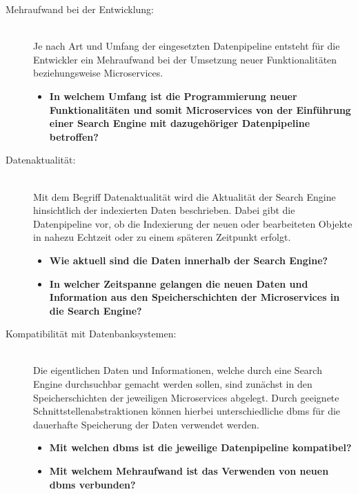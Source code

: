 \begin{description}
    \item[Mehraufwand bei der Entwicklung:]\hfill \\
    Je nach Art und Umfang der eingesetzten Datenpipeline entsteht für die Entwickler ein Mehraufwand bei der Umsetzung neuer Funktionalitäten beziehungsweise Microservices.
    
    \begin{itemize}
        \item \textbf{In welchem Umfang ist die Programmierung neuer Funktionalitäten und somit Microservices von der Einführung einer Search Engine mit dazugehöriger Datenpipeline betroffen?}
    \end{itemize}

    \item[Datenaktualität:]\hfill \\
    Mit dem Begriff \glqq Datenaktualität\grqq{} wird die Aktualität der Search Engine hinsichtlich der indexierten Daten beschrieben. Dabei gibt die Datenpipeline vor, ob die Indexierung der neuen oder bearbeiteten Objekte in nahezu Echtzeit oder zu einem späteren Zeitpunkt erfolgt.

    \begin{itemize}
        \item \textbf{Wie aktuell sind die Daten innerhalb der Search Engine?}
        \item \textbf{In welcher Zeitspanne gelangen die neuen Daten und Information aus den Speicherschichten der Microservices in die Search Engine?}
    \end{itemize}
    
    \item[Kompatibilität mit Datenbanksystemen:]\hfill \\
    Die eigentlichen Daten und Informationen, welche durch eine Search Engine \glqq durchsuchbar\grqq{} gemacht werden sollen, sind zunächst in den Speicherschichten der jeweiligen Microservices abgelegt. Durch geeignete Schnittstellenabstraktionen können hierbei unterschiedliche \gls{dbms} für die dauerhafte Speicherung der Daten verwendet werden.

    \begin{itemize}
        \item \textbf{Mit welchen \gls{dbms} ist die jeweilige Datenpipeline kompatibel?}
        \item \textbf{Mit welchem Mehraufwand ist das Verwenden von \glqq neuen\grqq{} \gls{dbms} verbunden?}
    \end{itemize}
    

\end{description}
